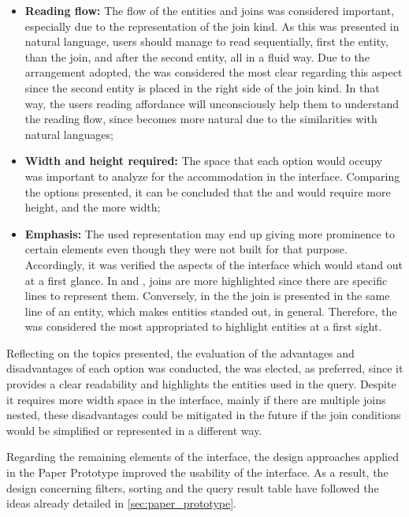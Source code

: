 \begin{itemize}
  \item \textbf{Reading flow: } The flow of the entities and joins was considered important, especially due to the representation of the join kind. As this was presented in natural language, users should manage to read sequentially, first the entity, than the join, and after the second entity, all in a fluid way. Due to the arrangement adopted, the  was considered the most clear regarding this aspect since the second entity is placed in the right side of the join kind. In that way, the users reading affordance will unconsciously help them to understand the reading flow, since becomes more natural due to the similarities with natural languages;
  \item \textbf{Width and height required: }The space that each option would occupy was important to analyze for the accommodation in the interface. Comparing the options presented, it can be concluded that the  and  would require more height, and the  more width;
  \item \textbf{Emphasis: }The used representation may end up giving more prominence to certain elements even though they were not built for that purpose. Accordingly, it was verified the aspects of the interface which would stand out at a first glance. In  and , joins are more highlighted since there are specific lines to represent them. Conversely, in the  the join is presented in the same line of an entity, which makes entities standed out, in general. Therefore, the  was considered the most appropriated to highlight entities at a first sight.
\end{itemize}

Reflecting on the topics presented, the evaluation of the advantages and disadvantages of each option was conducted, the  was elected, as preferred, since it provides a clear readability and highlights the entities used in the query. Despite it requires more width space in the interface, mainly if there are multiple joins nested, these disadvantages could be mitigated in the future if the join conditions would be simplified or represented in a different way.

Regarding the remaining elements of the interface, the design approaches applied in the Paper Prototype improved the usability of the interface. As a result, the design concerning filters, sorting and the query result table have followed the ideas already detailed in \ref{sec:paper_prototype}.


